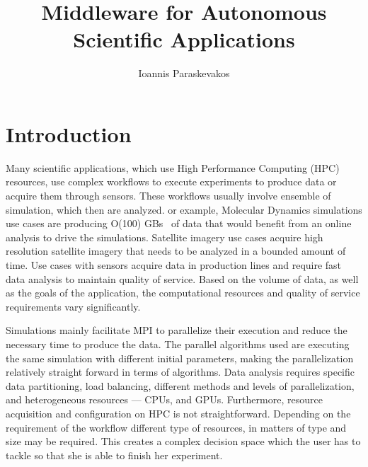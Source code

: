 

\title{Middleware for Autonomous Scientific Applications}
\author{Ioannis Paraskevakos}


\maketitle

\section{Introduction}
Many scientific applications, which use High Performance Computing (HPC) resources, 
use complex workflows to execute experiments to produce data or acquire them through 
sensors. These workflows usually involve ensemble of simulation, which then are analyzed. 
or example, Molecular Dynamics simulations use cases are producing O(100) GBs~\cite{cheatham2015impact} 
of data that would benefit from an online analysis to drive the simulations. Satellite 
imagery use cases acquire high resolution satellite imagery that needs to be analyzed 
in a bounded amount of time. Use cases with sensors acquire data in production lines 
and require fast data analysis to maintain quality of service. Based on the volume of 
data, as well as the goals of the application, the computational resources and quality 
of service requirements vary significantly. 


Simulations mainly facilitate MPI to parallelize their execution and reduce the necessary
time to produce the data. The parallel algorithms used are executing the same simulation with
different initial parameters, making the parallelization relatively straight forward in terms
of algorithms. Data analysis requires specific data partitioning, load balancing, different
methods and levels of parallelization, and heterogeneous resources --- CPUs, and GPUs.
Furthermore, resource acquisition and configuration on HPC is not straightforward. Depending
on the requirement of the workflow different type of resources, in matters of type and size
may be required. This creates a complex decision space which the user has to tackle so that
she is able to finish her experiment.


